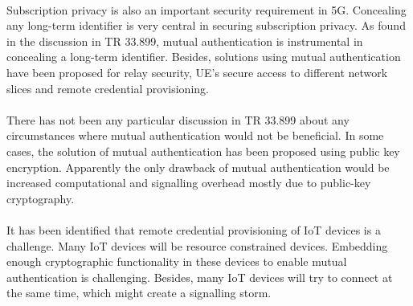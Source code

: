 \documentclass[12pt]{llncs}
\begin{document}
\paragraph{}
Subscription privacy is also an important security requirement in 5G. Concealing any long-term  identifier is very central in securing subscription privacy. As found in the discussion in TR 33.899, mutual authentication is instrumental in concealing a long-term identifier. Besides, solutions using mutual authentication have been proposed for relay security, UE's secure access to different network slices and remote credential provisioning.
\paragraph{}
There has not been any particular discussion in TR 33.899 about any circumstances where mutual authentication would not be beneficial. In some cases, the solution of mutual authentication has been proposed using public key encryption. Apparently the only drawback of mutual authentication would be  increased computational and signalling overhead mostly due to public-key cryptography.
\paragraph{}
It has been identified that remote credential provisioning of IoT devices is a challenge. Many IoT devices will be resource constrained devices. Embedding enough cryptographic functionality in these devices to enable mutual authentication is challenging. Besides, many IoT devices will try to connect at the same time, which might create a signalling storm.
\end{document}
